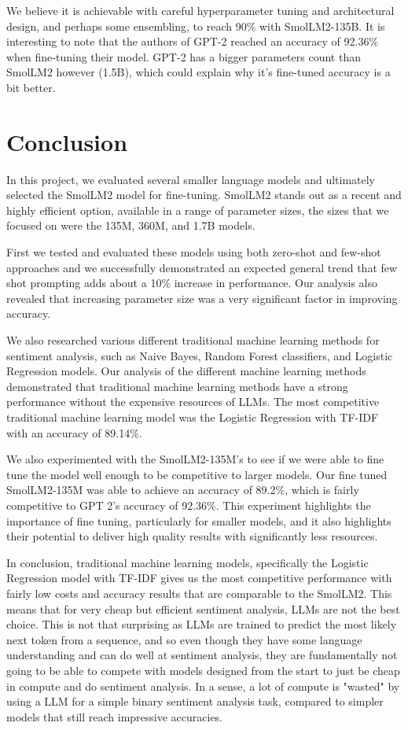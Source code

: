 \documentclass[10pt,twocolumn,letterpaper]{article}
\begin{document}
We believe it is achievable with careful hyperparameter tuning and architectural design, and perhaps some ensembling, to reach 90\% with SmolLM2-135B.
It is interesting to note that the authors of GPT-2 \cite{radford2019language} reached an accuracy of 92.36\% when fine-tuning their model. GPT-2 has a bigger parameters count than SmolLM2 however (1.5B), which could explain why it's fine-tuned accuracy is a bit better.

\section{Conclusion}
In this project, we evaluated several smaller language models and ultimately selected the SmolLM2 model for fine-tuning. SmolLM2 stands out as a recent and highly efficient option, available in a range of parameter sizes, the sizes that we focused on were the 135M, 360M, and 1.7B models. 

First we tested and evaluated these models using both zero-shot and few-shot approaches and we successfully demonstrated an expected general trend that few shot prompting adds about a 10\% increase in performance. Our analysis also revealed that increasing parameter size was a very significant factor in improving accuracy. 

We also researched various different traditional machine learning methods for sentiment analysis, such as Naive Bayes, Random Forest classifiers, and Logistic Regression models. Our analysis of the different machine learning methods demonstrated that traditional machine learning methods have a strong performance without the expensive resources of LLMs. The most competitive traditional machine learning model was the Logistic Regression with TF-IDF with an accuracy of 89.14\%.

We also experimented with the SmolLM2-135M’s to see if we were able to fine tune the model well enough to be competitive to larger models. Our fine tuned SmolLM2-135M was able to achieve an accuracy of 89.2\%, which is fairly competitive to GPT 2’s accuracy of 92.36\%. This experiment highlights the importance of fine tuning, particularly for smaller models, and it also highlights their potential to deliver high quality results with significantly less resources.

In conclusion, traditional machine learning models, specifically the Logistic Regression model with TF-IDF gives us the most competitive performance with fairly low costs and accuracy results that are comparable to the SmolLM2. 
This means that for very cheap but efficient sentiment analysis, LLMs are not the best choice. This is not that surprising as LLMs are trained to predict the most likely next token from a sequence, and so even though they have some language understanding and can do well at sentiment analysis, they are fundamentally not going to be able to compete with models designed from the start to just be cheap in compute and do sentiment analysis. In a sense, a lot of compute is "wasted" by using a LLM for a simple binary sentiment analysis task, compared to simpler models that still reach impressive accuracies.
\end{document}
